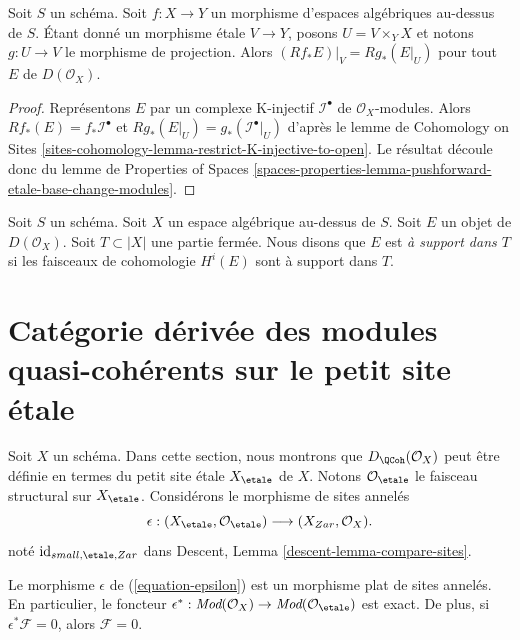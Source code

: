 \begin{lemma}
\label{lemma-restrict-direct-image-open}
Soit $S$ un schéma. Soit $f : X \to Y$ un morphisme d'espaces algébriques
au-dessus de $S$. Étant donné un morphisme étale $V \to Y$, posons $U = V \times_Y X$
et notons $g : U \to V$ le morphisme de projection. Alors
$(Rf_*E)|_V = Rg_*(E|_U)$ pour tout $E$ de $D(\mathcal{O}_X)$.
\end{lemma}

\begin{proof}
Représentons $E$ par un complexe K-injectif $\mathcal{I}^\bullet$ de
$\mathcal{O}_X$-modules. Alors $Rf_*(E) = f_*\mathcal{I}^\bullet$
et $Rg_*(E|_U) = g_*(\mathcal{I}^\bullet|_U)$ d'après le lemme
de Cohomology on Sites
\ref{sites-cohomology-lemma-restrict-K-injective-to-open}.
Le résultat découle donc du lemme
de Properties of Spaces
\ref{spaces-properties-lemma-pushforward-etale-base-change-modules}.
\end{proof}

\begin{definition}
\label{definition-supported-on}
Soit $S$ un schéma. Soit $X$ un espace algébrique au-dessus de $S$.
Soit $E$ un objet de $D(\mathcal{O}_X)$.
Soit $T \subset |X|$ une partie fermée.
Nous disons que $E$ est {\it à support dans $T$} si les
faisceaux de cohomologie $H^i(E)$ sont à support dans $T$.
\end{definition}








\section{Catégorie dérivée des modules quasi-cohérents sur le petit site \'etale}
\label{section-derived-quasi-coherent-etale}

\noindent
Soit $X$ un schéma. Dans cette section, nous montrons que
$D_\QCoh(\mathcal{O}_X)$
peut être définie en termes du petit site étale $X_\etale$ de $X$.
Notons $\mathcal{O}_\etale$ le faisceau structural sur
$X_\etale$. 
Considérons le morphisme de sites annelés
\begin{equation}
\label{equation-epsilon}
\epsilon :
(X_\etale, \mathcal{O}_\etale)
\longrightarrow
(X_{Zar}, \mathcal{O}_X).
\end{equation}
noté $\text{id}_{small, \etale, Zar}$ dans
Descent, Lemma \ref{descent-lemma-compare-sites}.

\begin{lemma}
\label{lemma-epsilon-flat}
Le morphisme $\epsilon$ de (\ref{equation-epsilon})
est un morphisme plat de sites annelés. En particulier, le foncteur
$\epsilon^* : \textit{Mod}(\mathcal{O}_X) \to
\textit{Mod}(\mathcal{O}_\etale)$ est exact.
De plus, si $\epsilon^*\mathcal{F} = 0$, alors $\mathcal{F} = 0$.
\end{lemma}


